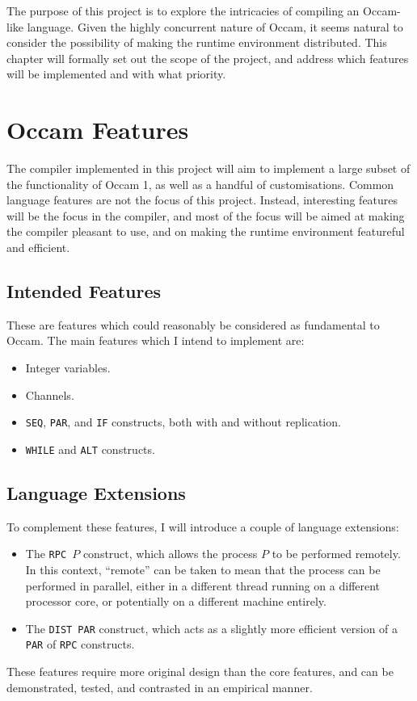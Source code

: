 The purpose of this project is to explore the intricacies of compiling an
Occam-like language. Given the highly concurrent nature of Occam, it seems
natural to consider the possibility of making the runtime environment
distributed. This chapter will formally set out the scope of the project, and
address which features will be implemented and with what priority.

\section{Occam Features}

The compiler implemented in this project will aim to implement a large subset of
the functionality of Occam 1, as well as a handful of customisations. Common
language features are not the focus of this project. Instead, interesting
features will be the focus in the compiler, and most of the focus will be aimed
at making the compiler pleasant to use, and on making the runtime environment
featureful and efficient.

\subsection{Intended Features}

These are features which could reasonably be considered as fundamental to Occam.
The main features which I intend to implement are:
\begin{itemize}
  \item Integer variables.
  \item Channels.
  \item \texttt{SEQ}, \texttt{PAR}, and \texttt{IF} constructs, both with and
        without replication.
  \item \texttt{WHILE} and \texttt{ALT} constructs.
\end{itemize}

\subsection{Language Extensions}

To complement these features, I will introduce a couple of language extensions:
\begin{itemize}
  \item
    The \texttt{RPC $P$} construct, which allows the process $P$ to be performed
    remotely. In this context, ``remote'' can be taken to mean that the process
    can be performed in parallel, either in a different thread running on a
    different processor core, or potentially on a different machine entirely.
  \item
    The \texttt{DIST PAR} construct, which acts as a slightly more efficient
    version of a \texttt{PAR} of \texttt{RPC} constructs.
\end{itemize}
These features require more original design than the core features, and can be
demonstrated, tested, and contrasted in an empirical manner.

